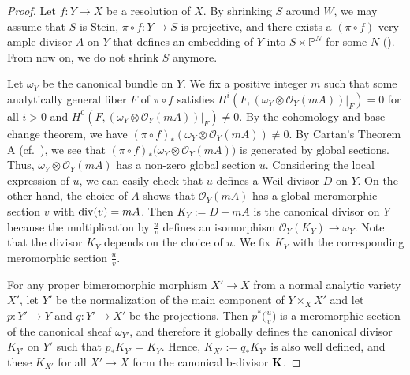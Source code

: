 \documentclass[12pt]{amsart}
\theoremstyle{definition}
\begin{document}
\begin{proof}
Let $f \colon Y \to X$ be a resolution of $X$. 
By shrinking $S$ around $W$, we may assume that $S$ is Stein, $\pi \circ f \colon Y \to S$ is projective,   and there exists a $(\pi \circ f)$-very ample divisor $A$ on $Y$ that defines an embedding of $Y$ into $S \times \mathbb{P}^{N}$ for some $N$ (\cite[Lemma 2.2]{eh-semistablereduction}). 
From now on, we do not shrink $S$ anymore. 

Let $\omega_{Y}$ be the canonical bundle on $Y$. 
We fix a positive integer $m$ such that some analytically general fiber $F$ of $\pi \circ f$ satisfies $H^{i}(F,(\omega_{Y}\otimes \mathcal{O}_{Y}(mA))|_{F}) = 0$ for all $i>0$ and $H^{0}(F,(\omega_{Y}\otimes \mathcal{O}_{Y}(mA))|_{F}) \neq 0$.
By the cohomology and base change theorem, we have $(\pi \circ f)_{*}(\omega_{Y}\otimes \mathcal{O}_{Y}(mA))\neq 0$. 
By Cartan's Theorem A (cf.~\cite[Theorem 2.6]{fujino-analytic-bchm}), we see that $(\pi \circ f)_{*}\bigl(\omega_{Y}\otimes \mathcal{O}_{Y}(mA)\bigr)$ is generated by global sections. 
Thus, $\omega_{Y}\otimes \mathcal{O}_{Y}(mA)$ has a non-zero global section $u$. 
Considering the local expression of $u$, we can easily check that $u$ defines a Weil divisor $D$ on $Y$. 
On the other hand, the choice of $A$ shows that $\mathcal{O}_{Y}(mA)$ has a global meromorphic section $v$ with ${\rm div}(v)=mA$. 
Then $K_{Y}:=D-mA$ is the canonical divisor on $Y$ because the multiplication by $\frac{u}{v}$ defines an isomorphism $\mathcal{O}_{Y}(K_{Y})\to \omega_{Y}$. 
Note that the divisor $K_{Y}$ depends on the choice of $u$. 
We fix $K_{Y}$ with the corresponding meromorphic section $\frac{u}{v}$.

For any proper bimeromorphic morphism $X' \to X$ from a normal analytic variety $X'$, let $Y'$ be the normalization of the main component of $Y \times_{X}X'$ and let $p \colon Y' \to Y$ and $q \colon Y' \to X'$ be the projections. 
Then $p^{*}\bigl(\frac{u}{v}\bigr)$ is a meromorphic section of the canonical sheaf $\omega_{Y'}$, and therefore it globally defines the canonical divisor $K_{Y'}$ on $Y'$ such that $p_{*}K_{Y'}=K_{Y}$. 
Hence, $K_{X'}:=q_{*}K_{Y'}$ is also well defined, and these $K_{X'}$ for all $X' \to X$ form the canonical b-divisor $\boldsymbol{\rm K}$.
\end{proof}
\end{document}
